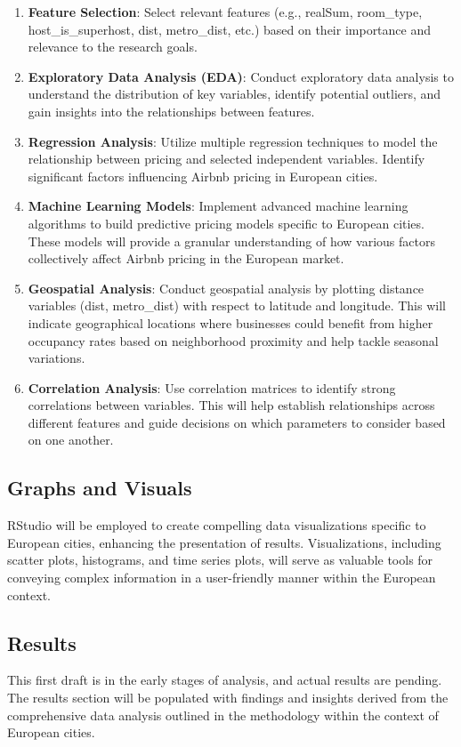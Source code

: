 \documentclass[12pt, letterpaper]{article}
\begin{document}
\begin{enumerate}
  \item \textbf{Feature Selection}: Select relevant features (e.g., realSum, room\_type, host\_is\_superhost, dist, metro\_dist, etc.) based on their importance and relevance to the research goals.
  \item \textbf{Exploratory Data Analysis (EDA)}: Conduct exploratory data analysis to understand the distribution of key variables, identify potential outliers, and gain insights into the relationships between features.
  \item \textbf{Regression Analysis}: Utilize multiple regression techniques to model the relationship between pricing and selected independent variables. Identify significant factors influencing Airbnb pricing in European cities.
  \item \textbf{Machine Learning Models}: Implement advanced machine learning algorithms to build predictive pricing models specific to European cities. These models will provide a granular understanding of how various factors collectively affect Airbnb pricing in the European market.
  \item \textbf{Geospatial Analysis}: Conduct geospatial analysis by plotting distance variables (dist, metro\_dist) with respect to latitude and longitude. This will indicate geographical locations where businesses could benefit from higher occupancy rates based on neighborhood proximity and help tackle seasonal variations.
  \item \textbf{Correlation Analysis}: Use correlation matrices to identify strong correlations between variables. This will help establish relationships across different features and guide decisions on which parameters to consider based on one another.
\end{enumerate}

\subsection*{Graphs and Visuals}
RStudio will be employed to create compelling data visualizations specific to European cities, enhancing the presentation of results. Visualizations, including scatter plots, histograms, and time series plots, will serve as valuable tools for conveying complex information in a user-friendly manner within the European context.

\subsection*{Results}
This first draft is in the early stages of analysis, and actual results are pending. The results section will be populated with findings and insights derived from the comprehensive data analysis outlined in the methodology within the context of European cities.
\end{document}
